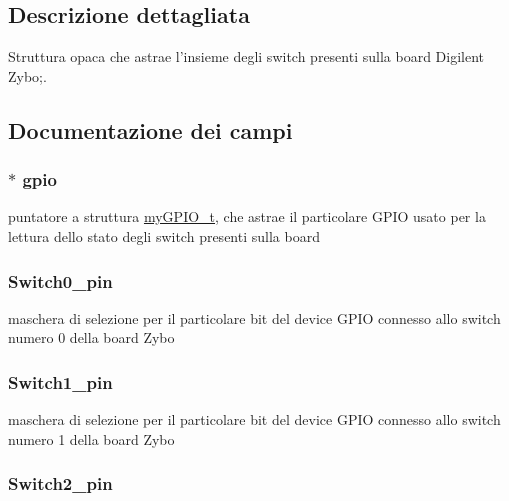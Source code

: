 \subsection{Descrizione dettagliata}
Struttura opaca che astrae l'insieme degli switch presenti sulla board Digilent Zybo;. 

\subsection{Documentazione dei campi}
\hypertarget{struct_zybo_switch__t_ac37ddc7c58d246d233dfb38037020184}{
\subsubsection[{gpio}]{$\ast$ gpio}}\label{struct_zybo_switch__t_ac37ddc7c58d246d233dfb38037020184}
puntatore a struttura \hyperlink{structmy_g_p_i_o__t}{my\+G\+P\+I\+O\+\_\+t}, che astrae il particolare G\+P\+I\+O usato per la lettura dello stato degli switch presenti sulla board \hypertarget{struct_zybo_switch__t_aa125c82837d72bdb20a0e22f3a86646e}{
\subsubsection[{Switch0\+\_\+pin}]{ Switch0\+\_\+pin}}\label{struct_zybo_switch__t_aa125c82837d72bdb20a0e22f3a86646e}
maschera di selezione per il particolare bit del device G\+P\+I\+O connesso allo switch numero 0 della board Zybo \hypertarget{struct_zybo_switch__t_aa031241ea0c12a6f327d3697113e992c}{
\subsubsection[{Switch1\+\_\+pin}]{ Switch1\+\_\+pin}}\label{struct_zybo_switch__t_aa031241ea0c12a6f327d3697113e992c}
maschera di selezione per il particolare bit del device G\+P\+I\+O connesso allo switch numero 1 della board Zybo \hypertarget{struct_zybo_switch__t_aacdefa991c974546015032b1bb95ea1e}{
\subsubsection[{Switch2\+\_\+pin}]{ Switch2\+\_\+pin}}\label{struct_zybo_switch__t_aacdefa991c974546015032b1bb95ea1e}
